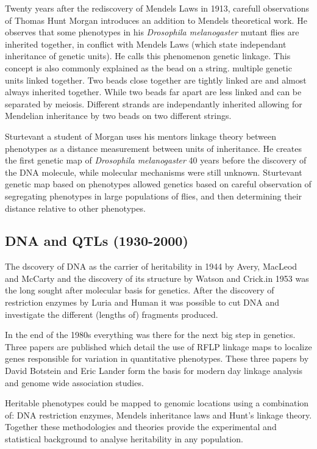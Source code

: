 Twenty years after the rediscovery of Mendels Laws in 1913, carefull observations of 
Thomas Hunt Morgan introduces an addition to Mendels theoretical work. He observes 
that some phenotypes in his \emph{Drosophila melanogaster} mutant flies are inherited 
together, in conflict with Mendels Laws (which state independant inheritance of 
genetic units). He calls this phenomenon genetic linkage. This concept is also commonly 
explained as the bead on a string. multiple genetic units linked together. Two beads 
close together are tightly linked are and almost always inherited together. While 
two beads far apart are less linked and can be separated by meiosis. Different 
strands are independantly inherited allowing for Mendelian inheritance by two beads 
on two different strings.

Sturtevant a student of Morgan uses his mentors linkage theory between phenotypes 
as a distance measurement between units of inheritance. He creates the first genetic 
map of \emph{Drosophila melanogaster} 40 years before the discovery of the DNA molecule, 
while molecular mechanisms were still unknown. Sturtevant genetic map based on 
phenotypes allowed genetics based on careful observation of segregating phenotypes in 
large populations of flies, and then determining their distance relative to other 
phenotypes.

\subsection{DNA and QTLs (1930-2000)}

The dscovery of DNA as the carrier of heritability in 1944 by Avery, MacLeod and McCarty 
\cite{Avery:1944} and the discovery of its structure by Watson and Crick.in 1953 
\cite{Watson:1953} was the long sought after molecular basis for genetics. After the 
discovery of restriction enzymes by Luria and Human \cite{Luria:1952} it was possible 
to cut DNA and investigate the different (lengths of) fragments produced.

In the end of the 1980s everything was there for the next big step in genetics. Three 
papers are published which detail the use of RFLP linkage maps to localize genes 
responsible for variation in quantitative phenotypes. These three papers by David Botstein 
and Eric Lander \cite{Lander:1986, Lander:1987, Lander:1989} form the basis for modern 
day linkage analysis and genome wide association studies. 

Heritable phenotypes could be mapped to genomic locations using a combination of: DNA 
restriction enzymes, Mendels inheritance laws and Hunt's linkage theory. Together these 
methodologies and theories provide the experimental and statistical background to 
analyse heritability in any population.

